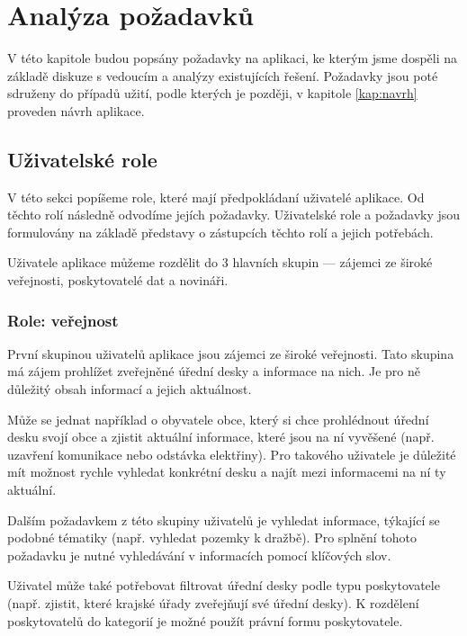 
\chapter{Analýza požadavků}\label{kap:pozadavky}

V této kapitole budou popsány požadavky na aplikaci, ke kterým jsme dospěli na základě diskuze s vedoucím a analýzy existujících řešení. Požadavky jsou poté sdruženy do případů užití, podle kterých je později, v kapitole \ref{kap:navrh} proveden návrh aplikace.  

\section{Uživatelské role}\label{sec:role}

V této sekci popíšeme role, které mají předpokládaní uživatelé aplikace. Od těchto rolí následně odvodíme jejích požadavky. Uživatelské role a požadavky jsou formulovány na základě představy o zástupcích těchto rolí a jejich potřebách.

Uživatele aplikace můžeme rozdělit do 3 hlavních skupin --- zájemci ze široké veřejnosti, poskytovatelé dat a novináři.

\subsection{Role: veřejnost}

První skupinou uživatelů aplikace jsou zájemci ze široké veřejnosti. Tato skupina má zájem prohlížet zveřejněné úřední desky a informace na nich. Je pro ně důležitý obsah informací a jejich aktuálnost. 

Může se jednat například o obyvatele obce, který si chce prohlédnout úřední desku svojí obce a zjistit aktuální informace, které jsou na ní vyvěšené (např. uzavření komunikace nebo odstávka elektřiny). Pro takového uživatele je důležité mít možnost rychle vyhledat konkrétní desku a najít mezi informacemi na ní ty aktuální.

Dalším požadavkem z této skupiny uživatelů je vyhledat informace, týkající se podobné tématiky (např. vyhledat pozemky k dražbě). Pro splnění tohoto požadavku je nutné vyhledávání v informacích pomocí klíčových slov.

Uživatel může také potřebovat filtrovat úřední desky podle typu poskytovatele (např. zjistit, které krajské úřady zveřejňují své úřední desky). K rozdělení poskytovatelů do kategorií je možné použít právní formu poskytovatele.

